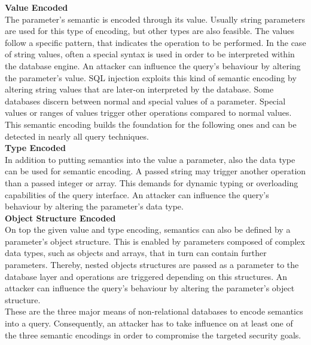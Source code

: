 \textbf{Value Encoded} \\
The parameter's semantic is encoded through its value. Usually string parameters are used for this type of encoding, but other types are also feasible. The values follow a specific pattern, that indicates the operation to be performed. In the case of string values, often a special syntax is used in order to be interpreted within the database engine. An attacker can influence the query's behaviour by altering the parameter's value. SQL injection exploits this kind of semantic encoding by altering string values that are later-on interpreted by the database. Some databases discern between normal and special values of a parameter. Special values or ranges of values trigger other operations compared to normal values. This semantic encoding builds the foundation for the following ones and can be detected in nearly all query techniques.\\

\textbf{Type Encoded} \\
In addition to putting semantics into the value a parameter, also the data type can be used for semantic encoding. A passed string may trigger another operation than a passed integer or array. This demands for dynamic typing or overloading capabilities of the query interface. An attacker can influence the query's behaviour by altering the parameter's data type.\\

\textbf{Object Structure Encoded} \\
On top the given value and type encoding, semantics can also be defined by a parameter's object structure. This is enabled by parameters composed of complex data types, such as objects and arrays, that in turn can contain further parameters. Thereby, nested objects structures are passed as a parameter to the database layer and operations are triggered depending on this structures. An attacker can influence the query's behaviour by altering the parameter's object structure.\\

These are the three major means of non-relational databases to encode semantics into a query. Consequently, an attacker has to take influence on at least one of the three semantic encodings in order to compromise the targeted security goals.

